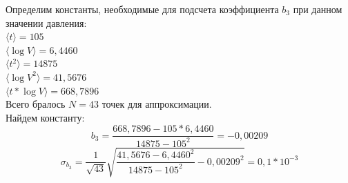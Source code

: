 \documentclass[a4paper,12pt]{article}
\begin{document}
Определим константы, необходимые для подсчета коэффициента $b_3$ при данном значении давления:\\
$\langle t \rangle = 105$\\ 
$\langle \log V \rangle = 6,4460$\\
$\langle t^2 \rangle = 14875$\\
$\langle \log V^2 \rangle = 41,5676$\\
$\langle t*\log V \rangle = 668,7896$\\
Всего бралось $ N = 43$ точек для аппроксимации. \\
Найдем константу:
\begin{equation*}
b_3= \dfrac{668,7896 - 105*6,4460}{14875 - 105^2} = -0,00209
\end{equation*}
\begin{equation*}
\sigma_{b_3} = \frac{1}{\sqrt{43}}\sqrt{\frac{41,5676 - 6,4460^2}{14875 - 105^2} - 0,00209^2} = 0,1 * 10^{-3}
\end{equation*}
\end{document}
